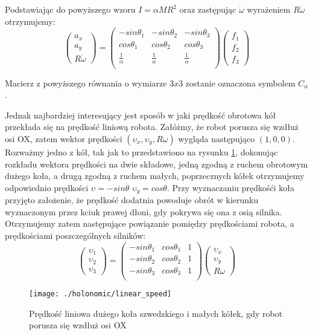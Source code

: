 Podstawiając do powyższego wzoru $I=\alpha MR^2$ oraz zastępując $\dot{\omega}$ wyrażeniem $R\dot{\omega}$ otrzymujemy:
\begin{equation}
 \begin{pmatrix}
  a_x\\
  a_y\\
  R\dot{\omega}
 \end{pmatrix}
  =
\begin{pmatrix}
  -sin\theta_1 & -sin\theta_2 & -sin\theta_3 \\
  cos\theta_1 & cos\theta_2 & cos\theta_3 \\
  \frac{1}{\alpha} & \frac{1}{\alpha} & \frac{1}{\alpha}\\
 \end{pmatrix} 
 \begin{pmatrix}
  f_1\\
  f_2\\
  f_3
 \end{pmatrix}
\end{equation}

Macierz z powyższego równania o wymiarze $3x3$ zostanie oznaczona symbolem $C_{\alpha}$.

Jednak najbardziej interesujący jest sposób w jaki prędkość obrotowa kół przekłada się na prędkość liniową robota.
Załóżmy, że robot porusza się wzdłuż osi OX, zatem wektor prędkości $(\upsilon_{x}, \upsilon_{y}, R\omega)$ wygląda następująco $(1,0,0)$.
Rozważmy jedno z kół, tak jak to przedstawiono na rysunku \ref{fig:linear_speed}, dokonując rozkładu wektora prędkości na dwie składowe, jedną zgodną z ruchem
obrotowym dużego koła, a drugą zgodną z ruchem małych, poprzecznych kółek otrzymujemy odpowiednio prędkości $\upsilon=-sin\theta$ $\upsilon_{y}=cos\theta$.
Przy wyznaczaniu prędkośći koła przyjęto założenie, że prędkość dodatnia powoduje obrót w kierunku wyznaczonym przez kciuk prawej dłoni, gdy pokrywa się ona z osią 
silnika.
Otrzymujemy zatem następujące powiązanie pomiędzy prędkościami robota, a prędkościami poszczególnych silników:
 \begin{equation}
 \begin{pmatrix}
  \upsilon_1\\
  \upsilon_2\\
  \upsilon_3
 \end{pmatrix}
  =
\begin{pmatrix}
  -sin\theta_1 & cos\theta_1 & 1 \\
  -sin\theta_2 & cos\theta_2 & 1 \\
  -sin\theta_3 & cos\theta_3 & 1 \\
 \end{pmatrix} 
 \begin{pmatrix}
  \upsilon_x\\
  \upsilon_y\\
  R\omega
 \end{pmatrix}
\end{equation}
\begin{figure}[h]
\centering
\texttt{[image: ./holonomic/linear\_speed]}
\caption{ Prędkość liniowa dużego koła szwedzkiego i małych kółek, gdy robot porusza się wzdłuż osi OX }\label{fig:linear_speed}
\end{figure}

